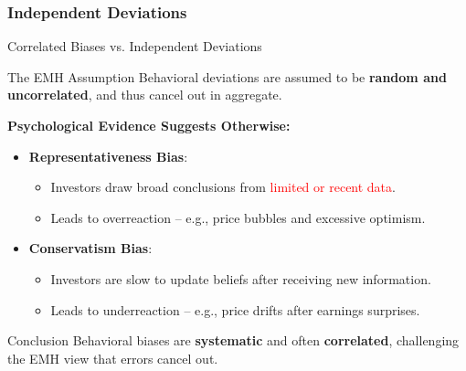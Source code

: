 \subsubsection{Independent Deviations}
\begin{frame}{Correlated Biases vs. Independent Deviations}
	
	\begin{block}{The EMH Assumption}
		Behavioral deviations are assumed to be \textbf{random and uncorrelated}, and thus cancel out in aggregate.
	\end{block}
	
	\vspace{0.3cm}
	\textbf{Psychological Evidence Suggests Otherwise:}
	\begin{itemize}
		\item \textbf{Representativeness Bias}:
		\begin{itemize}
			\item Investors draw broad conclusions from \textcolor{red}{limited or recent data}.
			\item Leads to overreaction -- e.g., price bubbles and excessive optimism.
		\end{itemize}
		
		\item \textbf{Conservatism Bias}:
		\begin{itemize}
			\item Investors are slow to update beliefs after receiving new information.
			\item Leads to underreaction -- e.g., price drifts after earnings surprises.
		\end{itemize}
	\end{itemize}
	\begin{alertblock}{Conclusion}
		Behavioral biases are \textbf{systematic} and often \textbf{correlated}, challenging the EMH view that errors cancel out.
	\end{alertblock}
	
\end{frame}

